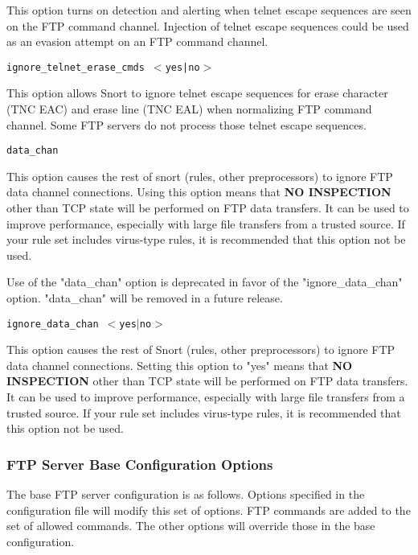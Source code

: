 \documentclass[english]{report}
\newcounter{slistnum}
\newenvironment{slist}
{ \begin{list}{ {\bf \arabic{slistnum}.} }{\usecounter{slistnum} } }
{ \end{list} }
\begin{document}
\begin{slist}
This option turns on detection and alerting when telnet escape sequences are
seen on the FTP command channel.  Injection of telnet escape sequences could be
used as an evasion attempt on an FTP command channel.

\item \texttt{ignore\_telnet\_erase\_cmds $<$yes|no$>$}

This option allows Snort to ignore telnet escape sequences for erase character
(TNC EAC) and erase line (TNC EAL) when normalizing FTP command channel.  Some FTP
servers do not process those telnet escape sequences.

\item \texttt{data\_chan}

This option causes the rest of snort (rules, other preprocessors) to ignore FTP
data channel connections.  Using this option means that \textbf{NO INSPECTION}
other than TCP state will be performed on FTP data transfers.  It can be used
to improve performance, especially with large file transfers from a trusted
source.   If your rule set includes virus-type rules, it is recommended that
this option not be used.

Use of the "data\_chan" option is deprecated in favor of the
"ignore\_data\_chan" option. "data\_chan" will be removed in a future release.

\item \texttt{ignore\_data\_chan $<$yes$|$no$>$}

This option causes the rest of Snort (rules, other preprocessors) to ignore FTP
data channel connections.  Setting this option to "yes" means that \textbf{NO
INSPECTION} other than TCP state will be performed on FTP data transfers.  It
can be used to improve performance, especially with large file transfers from a
trusted source.  If your rule set includes virus-type rules, it is recommended
that this option not be used.

\end{slist}

\subsubsection{FTP Server Base Configuration Options}
\label{sub:default ftp server config}

The base FTP server configuration is as follows.  Options specified in the
configuration file will modify this set of options.  FTP commands are added to
the set of allowed commands.  The other options will override those in the base
configuration.
\end{document}
